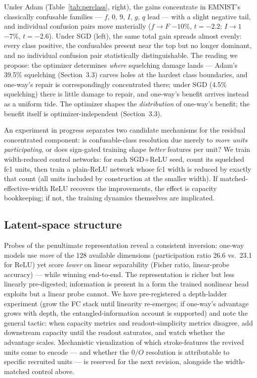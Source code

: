 \documentclass[11pt]{article}
\begin{document}
Under Adam (Table~\ref{tab:perclass}, right), the gains concentrate in
EMNIST's classically confusable families --- $f$, $0$, $9$, $I$, $g$,
$q$ lead --- with a slight negative tail, and individual confusion
pairs move materially ($f{\to}F$ $-10\%$, $t{=}{-}2.2$; $I{\to}1$
$-7\%$, $t{=}{-}2.6$). Under SGD (left), the same total gain spreads
almost evenly: every class positive, the confusables present near the
top but no longer dominant, and no individual confusion pair
statistically distinguishable. The reading we propose: the optimizer
determines \emph{where} squelching damage lands --- Adam's 39.5\%
squelching (Section~3.3) carves holes at the hardest class boundaries,
and one-way's repair is correspondingly concentrated there; under SGD
(4.5\% squelching) there is little damage to repair, and one-way's
benefit arrives instead as a uniform tide. The optimizer shapes the
\emph{distribution} of one-way's benefit; the benefit itself is
optimizer-independent (Section~3.3).

An experiment in progress separates two candidate mechanisms for the
residual concentrated component: is confusable-class resolution due
merely to \emph{more units participating}, or does sign-gated training
shape \emph{better} features per unit? We train width-reduced control
networks: for each SGD+ReLU seed, count its squelched fc1 units, then
train a plain-ReLU network whose fc1 width is reduced by exactly that
count (all units included by construction at the smaller width). If
matched-effective-width ReLU recovers the improvements, the effect is
capacity bookkeeping; if not, the training dynamics themselves are
implicated.

\subsection{Latent-space structure}

Probes of the penultimate representation reveal a consistent inversion:
one-way models use \emph{more} of the 128 available dimensions
(participation ratio 26.6 vs.\ 23.1 for ReLU) yet score \emph{lower} on
linear separability (Fisher ratio, linear-probe accuracy) --- while
winning end-to-end. The representation is richer but less linearly
pre-digested; information is present in a form the trained nonlinear
head exploits but a linear probe cannot. We have pre-registered a
depth-ladder experiment (grow the FC stack until linearity re-emerges;
if one-way's advantage grows with depth, the entangled-information
account is supported) and note the general tactic: when capacity
metrics and readout-simplicity metrics disagree, add downstream capacity
until the readout saturates, and watch whether the advantage scales.
Mechanistic visualization of which stroke-features the revived units
come to encode --- and whether the $0/O$ resolution is attributable to
specific recruited units --- is reserved for the next revision,
alongside the width-matched control above.
\end{document}
